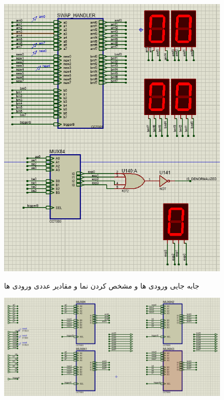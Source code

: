 \documentclass[twoside]{article}
\begin{document}
\begin{itemize}
		\begin{figure}[h!]
			\begin{center}
				\includegraphics[scale=0.45]{swap_handler}‎
				\caption{جابه جایی ورودی ها و مشخص کردن نما و مقادیر عددی ورودی ها}
			\end{center}
		\end{figure} 
		\begin{figure}[h!]
			\begin{center}
				\includegraphics[scale=0.3]{swap_handler_insider}‎

\end{center}
\end{figure}
\end{itemize}
\end{document}
